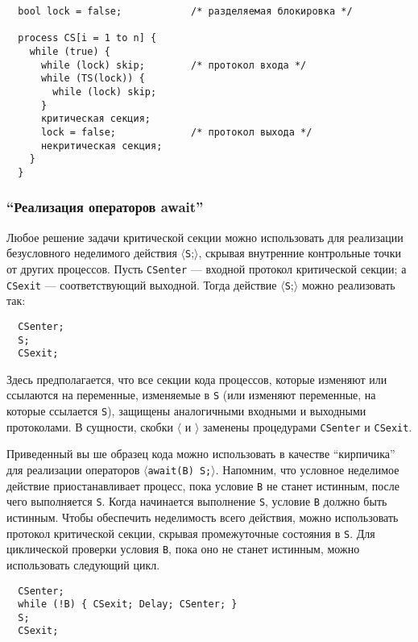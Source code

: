 \lstset{label=lst:critical-sec-check-check-set,
  caption=Критические секции на основе протокола
  ``проверить-проверить-установить''}
\begin{lstlisting}
  bool lock = false;            /* разделяемая блокировка */

  process CS[i = 1 to n] {
    while (true) {
      while (lock) skip;        /* протокол входа */
      while (TS(lock)) {
        while (lock) skip;
      }
      критическая секция;
      lock = false;             /* протокол выхода */
      некритическая секция;
    }
  }
\end{lstlisting}



\subsubsection{``Реализация операторов await''}

Любое решение задачи критической секции можно использовать для реализации
безусловного неделимого действия $\langle$\texttt{S};$\rangle$, скрывая
внутренние контрольные точки от других процессов. Пусть \texttt{CSenter} ---
входной протокол критической секции; а \texttt{CSexit} --- соответствующий
выходной. Тогда действие $\langle$\texttt{S};$\rangle$ можно реализовать так:
\lstset{caption=}
\begin{lstlisting}
  CSenter;
  S;
  CSexit;
\end{lstlisting}

Здесь предполагается, что все секции кода процессов, которые изменяют или
ссылаются на переменные, изменяемые в \texttt{S} (или изменяют переменные, на
которые ссылается \texttt{S}), защищены аналогичными входными и выходными
протоколами. В сущности, скобки $\langle$ и $\rangle$ заменены процедурами
\texttt{CSenter} и \texttt{CSexit}.

Приведенный вы ше образец кода можно использовать в качестве ``кирпичика'' для
реализации операторов $\langle$\texttt{await(B) S;}$\rangle$. Напомним, что
условное неделимое действие приостанавливает процесс, пока условие \texttt{B} не
станет истинным, после чего выполняется \texttt{S}. Когда начинается выполнение
\texttt{S}, условие \texttt{B} должно быть истинным. Чтобы обеспечить
неделимость всего действия, можно использовать протокол критической секции,
скрывая промежуточные состояния в \texttt{S}. Для циклической проверки условия
\texttt{B}, пока оно не станет истинным, можно использовать следующий цикл.

\lstset{caption=}
\begin{lstlisting}
  CSenter;
  while (!B) { CSexit; Delay; CSenter; }
  S;
  CSexit;
\end{lstlisting}

